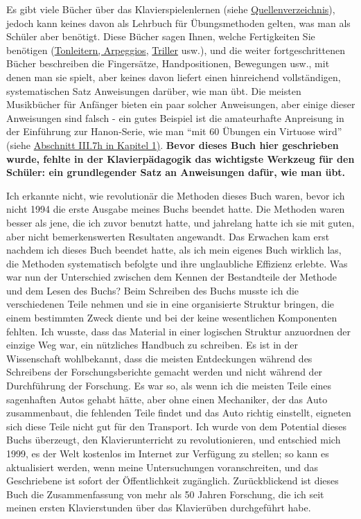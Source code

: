Es gibt viele Bücher über das Klavierspielenlernen (siehe \hyperref[reference]{Quellenverzeichnis}), jedoch kann keines davon als Lehrbuch für Übungsmethoden gelten, was man als Schüler aber benötigt.
Diese Bücher sagen Ihnen, welche Fertigkeiten Sie benötigen (\hyperref[c1iii5]{Tonleitern, Arpeggios}, \hyperref[c1iii3]{Triller} usw.), und die weiter fortgeschrittenen Bücher beschreiben die Fingersätze, Handpositionen, Bewegungen usw., mit denen man sie spielt, aber keines davon liefert einen hinreichend vollständigen, systematischen Satz Anweisungen darüber, wie man übt.
Die meisten Musikbücher für Anfänger bieten ein paar solcher Anweisungen, aber einige dieser Anweisungen sind falsch - ein gutes Beispiel ist die amateurhafte Anpreisung in der Einführung zur Hanon-Serie, wie man \enquote{mit 60 Übungen ein Virtuose wird} (siehe \hyperref[c1iii7h]{Abschnitt III.7h in Kapitel 1)}.
\textbf{Bevor dieses Buch hier geschrieben wurde, fehlte in der Klavierpädagogik das wichtigste Werkzeug für den Schüler: ein grundlegender Satz an Anweisungen dafür, wie man übt.}

Ich erkannte nicht, wie revolutionär die Methoden dieses Buch waren, bevor ich nicht 1994 die erste Ausgabe meines Buchs beendet hatte.
Die Methoden waren besser als jene, die ich zuvor benutzt hatte, und jahrelang hatte ich sie mit guten, aber nicht bemerkenswerten Resultaten angewandt.
Das Erwachen kam erst nachdem ich dieses Buch beendet hatte, als ich mein eigenes Buch wirklich las, die Methoden systematisch befolgte und ihre unglaubliche Effizienz erlebte.
Was war nun der Unterschied zwischen dem Kennen der Bestandteile der Methode und dem Lesen des Buchs?
Beim Schreiben des Buchs musste ich die verschiedenen Teile nehmen und sie in eine organisierte Struktur bringen, die einem bestimmten Zweck diente und bei der keine wesentlichen Komponenten fehlten.
Ich wusste, dass das Material in einer logischen Struktur anzuordnen der einzige Weg war, ein nützliches Handbuch zu schreiben.
Es ist in der Wissenschaft wohlbekannt, dass die meisten Entdeckungen während des Schreibens der Forschungsberichte gemacht werden und nicht während der Durchführung der Forschung.
Es war so, als wenn ich die meisten Teile eines sagenhaften Autos gehabt hätte, aber ohne einen Mechaniker, der das Auto zusammenbaut, die fehlenden Teile findet und das Auto richtig einstellt, eigneten sich diese Teile nicht gut für den Transport.
Ich wurde von dem Potential dieses Buchs überzeugt, den Klavierunterricht zu revolutionieren, und entschied mich 1999, es der Welt kostenlos im Internet zur Verfügung zu stellen;
so kann es aktualisiert werden, wenn meine Untersuchungen voranschreiten, und das Geschriebene ist sofort der Öffentlichkeit zugänglich.
Zurückblickend ist dieses Buch die Zusammenfassung von mehr als 50 Jahren Forschung, die ich seit meinen ersten Klavierstunden über das Klavierüben durchgeführt habe.

